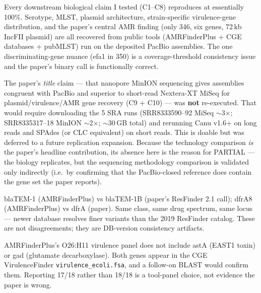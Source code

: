 \documentclass[11pt,letterpaper]{article}
\begin{document}
\begin{description}[leftmargin=1.2cm,style=nextline]
  \item[What replicated (strong).] Every downstream biological claim I tested
    (C1--C8) reproduces at essentially 100\%. Serotype, MLST, plasmid architecture,
    strain-specific virulence-gene distribution, and the paper's central AMR finding
    (only 346, six genes, 72\,kb IncFII plasmid) are all recovered from public
    tools (AMRFinderPlus + CGE databases + pubMLST) run on the deposited PacBio
    assemblies. The one discriminating-gene nuance (efa1 in 350) is a
    coverage-threshold consistency issue and the paper's binary call is
    functionally correct.

  \item[What did NOT replicate (methodological gap).] The paper's \emph{title}
    claim --- that nanopore MinION sequencing gives assemblies congruent with PacBio
    and superior to short-read Nextera-XT MiSeq for plasmid/virulence/AMR gene
    recovery (C9 + C10) --- was \textbf{not} re-executed. That would require
    downloading the 5 SRA runs (SRR8333590--92 MiSeq $\sim$3$\times$; SRR8335317--18
    MinION $\sim$2$\times$; $\sim$30\,GB total) and rerunning Canu v1.6+ on
    long reads and SPAdes (or CLC equivalent) on short reads. This is doable but
    was deferred to a future replication expansion. Because the technology
    comparison \emph{is} the paper's headline contribution, its absence here is
    the reason for PARTIAL --- the biology replicates, but the sequencing
    methodology comparison is validated only indirectly (i.e.\ by confirming that
    the PacBio-closed reference does contain the gene set the paper reports).

  \item[Nomenclature caveats, not disagreements.] blaTEM-1 (AMRFinderPlus) vs
    blaTEM-1B (paper's ResFinder 2.1 call); dfrA8 (AMRFinderPlus) vs dfrA (paper).
    Same class, same drug spectrum, same locus --- newer database resolves finer
    variants than the 2019 ResFinder catalog. These are not disagreements; they
    are DB-version consistency artifacts.

  \item[Tool-coverage gap for astA/gad.] AMRFinderPlus's O26:H11 virulence panel
    does not include astA (EAST1 toxin) or gad (glutamate decarboxylase). Both
    genes appear in the CGE VirulenceFinder \texttt{virulence\_ecoli.fsa}, and a
    follow-on BLAST would confirm them. Reporting 17/18 rather than 18/18 is a
    tool-panel choice, not evidence the paper is wrong.


\end{description}
\end{document}
